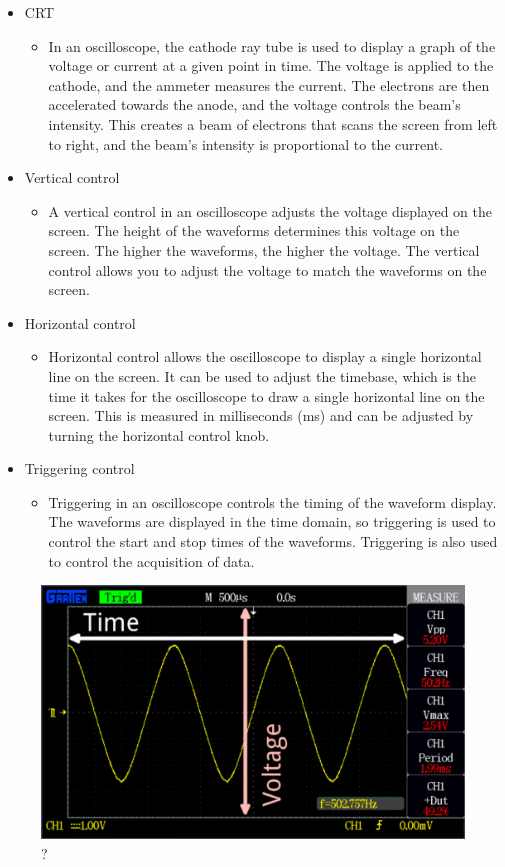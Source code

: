 \begin{itemize}
	\item CRT
	\begin{itemize}
		\item In an oscilloscope, the cathode ray tube is used to display a graph of the voltage or current at a given point in time. The voltage is applied to the cathode, and the ammeter measures the current. The electrons are then accelerated towards the anode, and the voltage controls the beam’s intensity. This creates a beam of electrons that scans the screen from left to right, and the beam’s intensity is proportional to the current.
	\end{itemize}
	\item Vertical control
	\begin{itemize}
		\item A vertical control in an oscilloscope adjusts the voltage displayed on the screen. The height of the waveforms determines this voltage on the screen. The higher the waveforms, the higher the voltage. The vertical control allows you to adjust the voltage to match the waveforms on the screen.
	\end{itemize}
	\item Horizontal control
	\begin{itemize}
		\item Horizontal control allows the oscilloscope to display a single horizontal line on the screen. It can be used to adjust the timebase, which is the time it takes for the oscilloscope to draw a single horizontal line on the screen. This is measured in milliseconds (ms) and can be adjusted by turning the horizontal control knob.
	\end{itemize}
	\item Triggering control
	\begin{itemize}
		\item Triggering in an oscilloscope controls the timing of the waveform display. The waveforms are displayed in the time domain, so triggering is used to control the start and stop times of the waveforms. Triggering is also used to control the acquisition of data.
	\end{itemize}
\end{itemize}

\begin{figure}[H]
	\centering
	\includegraphics[width=12cm]{images/img.png}
	\caption{?}
	\label{fig:dunno}
\end{figure}

